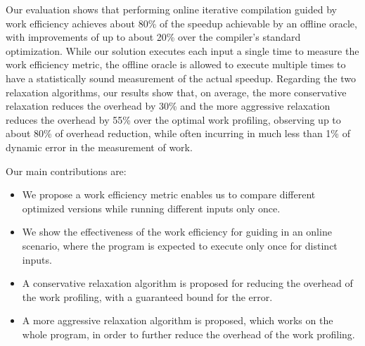     Our evaluation shows that performing online iterative compilation guided by work efficiency achieves about 80\%
    of the speedup achievable by an offline oracle, with improvements of up to about 20\% over the compiler's standard optimization.
    While our solution executes each input a single time to measure the work efficiency metric, the offline oracle is allowed to execute
    multiple times to have a statistically sound measurement of the actual speedup.
    Regarding the two relaxation algorithms, our results show that, on average, the more conservative relaxation reduces the overhead by 30\%
    and the more aggressive relaxation reduces the overhead by 55\% over the optimal work profiling, observing up to about 80\% of overhead reduction,
    while often incurring in much less than 1\% of dynamic error in the measurement of work.

    Our main contributions are:

    \begin{itemize}[leftmargin=3mm]
        \item We propose a work efficiency metric enables us to compare different optimized versions while running different inputs only once.

        \item We show the effectiveness of the work efficiency for guiding {\itercomp} in an online scenario, where the program is expected
        to execute only once for distinct inputs.

        \item A conservative relaxation algorithm is proposed for reducing the overhead of the work profiling, with a guaranteed bound for
        the error.

        \item A more aggressive relaxation algorithm is proposed, which works on the whole program, in order to further reduce the overhead
        of the work profiling.
    \end{itemize}
